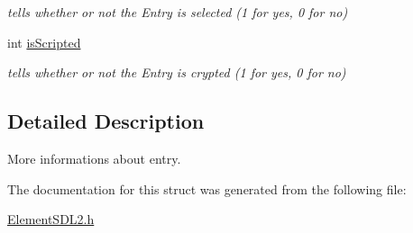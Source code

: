 \begin{DoxyCompactItemize}
\begin{DoxyCompactList}\small\item\em tells whether or not the Entry is selected (1 for yes, 0 for no) \end{DoxyCompactList}\item 
int \hyperlink{structEntrySDL2_ad367cfeed2432de311c8da686075fe42}{is\+Scripted}\hypertarget{structEntrySDL2_ad367cfeed2432de311c8da686075fe42}{}\label{structEntrySDL2_ad367cfeed2432de311c8da686075fe42}

\begin{DoxyCompactList}\small\item\em tells whether or not the Entry is crypted (1 for yes, 0 for no) \end{DoxyCompactList}\end{DoxyCompactItemize}


\subsection{Detailed Description}
More informations about entry. 

The documentation for this struct was generated from the following file\+:\begin{DoxyCompactItemize}
\item 
\hyperlink{ElementSDL2_8h}{Element\+S\+D\+L2.\+h}\end{DoxyCompactItemize}
